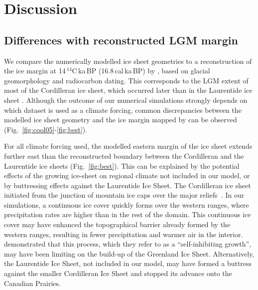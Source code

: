\section{Discussion}
\label{sec:discussion}

\subsection{Differences with reconstructed LGM margin}

We compare the numerically modelled ice sheet geometries to a reconstruction of the ice margin at 14\,$^{14}$C\,ka\,BP (16.8\,cal\,ka\,BP) by \citet{dyke-2004}, based on glacial geomorphology and radiocarbon dating. This corresponds to the LGM extent of most of the Cordilleran ice sheet, which occurred later than in the Laurentide ice sheet \citep{dyke-2004}.
Although the outcome of our numerical simulations strongly depends on which dataset is used as a climate forcing, common discrepancies between the modelled ice sheet geometry and the ice margin mapped by \citet{dyke-2004} can be observed (Fig.~\ref{fig:cool05}-\ref{fig:best}).

For all climate forcing used, the modelled eastern margin of the ice sheet extends further east than the reconstructed boundary between the Cordilleran and the Laurentide ice sheets (Fig.~\ref{fig:best}). This can be explained by the potential effects of the growing ice-sheet on regional climate not included in our model, or by buttressing effects against the Laurentide Ice Sheet. The Cordilleran ice sheet initiated from the junction of mountain ice caps over the major reliefs~\citep{clague-1989}. In our simulations, a continuous ice cover quickly forms over the western ranges, where precipitation rates are higher than in the rest of the domain. This continuous ice cover may have enhanced the topographical barrier already formed by the western ranges, resulting in fewer precipitation and warmer air in the interior. \citet{langen-etal-2012} demonstrated that this process, which they refer to as a ``self-inhibiting growth'', may have been limiting on the build-up of the Greenland Ice Sheet. Alternatively, the Laurentide Ice Sheet, not included in our model, may have formed a buttress against the smaller Cordilleran Ice Sheet and stopped its advance onto the Canadian Prairies.

